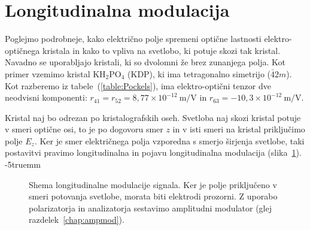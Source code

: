 \section{Longitudinalna modulacija}
Poglejmo podrobneje, kako električno polje spremeni optične lastnosti 
elektro-optičnega kristala in kako to vpliva na svetlobo, ki potuje skozi tak kristal.
Navadno se uporabljajo kristali, ki so dvolomni že brez zunanjega polja. 
Kot primer vzemimo kristal KH$_{2}$PO$_{4}$ (KDP), ki ima tetragonalno 
simetrijo ($\bar{4}2m$). Kot razberemo iz tabele~(\ref{table:Pockels}), ima 
elektro-optični tenzor dve neodvisni komponenti: $r_{41} = r_{52}=8,77 \times 10^{-12}~\si{\m/\V}$
in $r_{63}= -10,3 \times 10^{-12}~\si{\m/\V}$.

Kristal naj bo odrezan po kristalografskih oseh. Svetloba naj skozi kristal potuje 
v smeri optične osi, to je po dogovoru smer $z$ in v isti smeri na kristal priključimo
polje $E_z$. Ker je smer električnega polja vzporedna s smerjo širjenja svetlobe, taki 
postavitvi pravimo longitudinalna in pojavu longitudinalna 
modulacija (slika~\ref{fig:amshema}). 
\vglue-5truemm
\begin{figure}[h]
\centering
\def\svgwidth{80truemm} 

\caption{Shema longitudinalne modulacije signala. Ker je polje priključeno v smeri
potovanja svetlobe, morata biti elektrodi prozorni. Z uporabo polarizatorja in 
analizatorja sestavimo amplitudni modulator (glej razdelek~\ref{chap:ampmod}).}
\label{fig:amshema}
\end{figure}

